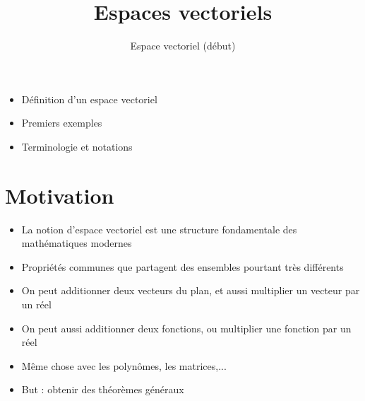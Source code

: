 


 





\title{{\bf Espaces vectoriels}}
\subtitle{Espace vectoriel (début)}

\begin{frame}
  
  \debutmontitre

  \pause

{\footnotesize
\hfill
{}
\begin{minipage}{0.6\textwidth}
  \begin{itemize}
    \item<3-> Définition d'un espace vectoriel
    \item<4-> Premiers exemples
    \item<5-> Terminologie et notations
  \end{itemize}
\end{minipage}
}

\end{frame}

\setcounter{framenumber}{0}


\section{Motivation}

\begin{frame}

\begin{itemize}[<+->]
  \item La notion d'espace vectoriel est une structure fondamentale des mathématiques modernes
  
  \item Propriétés communes que partagent des ensembles pourtant très différents
  
  \item On peut additionner deux vecteurs du plan, et aussi multiplier un vecteur par un réel
  
  \item On peut aussi additionner deux fonctions, ou multiplier une fonction par un réel
  
  \item Même chose avec les polynômes, les matrices,...
  
  \item But : obtenir des théorèmes généraux
\end{itemize}



\end{frame}



